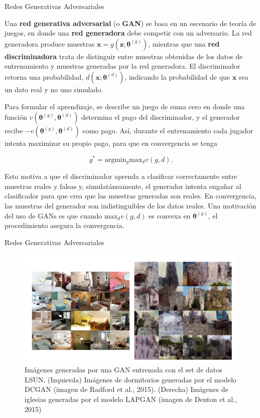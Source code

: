 \documentclass[handout, 9pt]{beamer}
\begin{document}
\begin{frame}{Redes Generativas Adversariales}

Una \textbf{red generativa adversarial} (o \textbf{GAN}) se basa en un escenario de teoría de juegos, en donde una \textbf{red generadora} debe competir con un adversario. La red generadora produce muestras $\bm{x} = g(\bm{z};\bm{\theta}^{(g)})$, mientras que una \textbf{red discriminadora} trata de distinguir entre muestras obtenidas de los datos de entrenamiento y muestras generadas por la red generadora. El discriminador retorna una probabilidad, $d(\bm{x};\bm{\theta}^{(d)})$, indicando la probabilidad de que $\bm{x}$ sea un dato real y no uno simulado. \pause
 
Para formular el aprendizaje, se describe un juego de suma cero en donde una función $v(\bm{\theta}^{(g)},\bm{\theta}^{(d)})$ determina el pago del discriminador, y el generador recibe $-v(\bm{\theta}^{(g)},\bm{\theta}^{(d)})$ como pago. Así, durante el entrenamiento cada jugador intenta maximizar su propio pago, para que en convergencia se tenga \pause

\begin{equation*}
g^{*} = \textrm{arg} \textrm{min}_{g} \textrm{max}_{d} v(g,d).
\end{equation*} \pause

Esto motiva a que el discriminador aprenda a clasificar correctamente entre muestras reales y falsas y, simulatáneamente, el generador intenta engañar al clasificador para que crea que las muestras generadas son reales. En convergencia, las muestras del generador son indistinguibles de los datos reales. Una motivación del uso de GANs es que cuando $\textrm{max}_{d} v(g,d)$ es convexa en $\bm{\theta}^{(g)}$, el procedimiento asegura la convergencia.


\end{frame}

\begin{frame}{Redes Generativas Adversariales}
\begin{figure}[H]
\captionsetup{font=small,labelfont=small}
\centering
\includegraphics[scale=.7]{../img/cap7_gans.PNG}
\caption{Imágenes generadas por una GAN entrenada con el set de datos LSUN. (Izquierda) Imágenes de dormitorios generadas por el modelo DCGAN (imagen de Radford et al., 2015). (Derecha) Imágenes de iglesias generadas por el modelo LAPGAN (imagen de Denton et al., 2015)}
\end{figure}

\end{frame}
\end{document}
